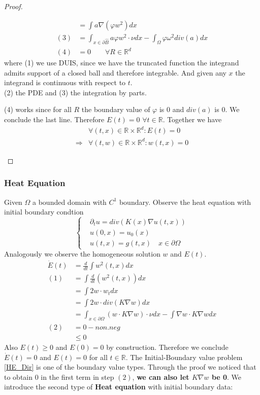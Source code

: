 \begin{proof}
\begin{enumerate}
\begin{align*}
			&= \int a \nabla(\varphi w^2)dx\\
		 (3)&= \int_{x \in \partial \hat{B}} a \varphi w^2 \cdot \nu dx -  \int_\Omega \varphi \omega^2 div(a) dx\\
		 (4)&= 0 \qquad \forall R \in \mathbb{R}^d
		\end{align*}
		where (1) we use DUIS, since we have the truncated function the integrand admits support of a closed ball and therefore integrable. And given any $x$ the integrand is continuous with respect to $t$. 
		\\ (2) the PDE and (3) the integration by parts.\par 
		(4) works since for all $R$ the boundary value of $\varphi$ is 0  and $div(a)$ is 0. We conclude the last line.
		Therefore $E(t) = 0$ $\forall t \in \mathbb{R}$. Together we have
		\begin{align*}
			&\forall (t, x) \in \mathbb{R} \times \mathbb{R}^d: E(t) = 0\\ \Rightarrow &\forall (t, w) \in \mathbb{R} \times \mathbb{R}^d: w(t, x) = 0
		\end{align*}
	\end{enumerate}
\end{proof}

\subsubsection*{Heat Equation}
Given $\Omega$ a bounded domain with $C^1$ boundary. Observe the heat equation with initial boundary condtion
\begin{equation}\label{HE_Dir}
	\left\{
	\begin{aligned}
		&\partial_t u = div(K(x) \nabla u(t, x))\\
		&u(0, x) = u_0(x)\\
		&u(t, x) = g(t, x) \quad x \in \partial \Omega
	\end{aligned}
	\right.
\end{equation}
Analogously we observe the homogeneous solution $w$ and $E(t)$. 
\begin{align*}
	\dot{E}(t) &= \frac{d}{dt} \int w^2(t, x)dx\\
	(1)&= \int \frac{d}{dt}(w^2(t, x)) dx\\
	   &= \int 2w \cdot w_t dx \\
 	   &= \int 2w \cdot div(K \nabla w) dx\\
	   &= \int_{x \in \partial \Omega} (w \cdot K \nabla w) \cdot \nu dx - \int \nabla w \cdot K \nabla wdx \\
	(2)&= 0  -  non.neg\\
	   &\leq 0
\end{align*}
Also $E(t) \geq 0$ and $E(0) = 0$ by construction. Therefore we conclude $\dot{E}(t) = 0$ and $E(t) = 0$ for all $t \in \mathbb{R}$.
The Initial-Boundary value problem \ref{HE_Dir} is one of the boundary value types. Through the proof we noticed that to obtain $0$ in the first term in step $(2)$, \textbf{we can also let $K \nabla w$ be 0}. We introduce the second type of \textbf{Heat equation} with initial boundary data:


